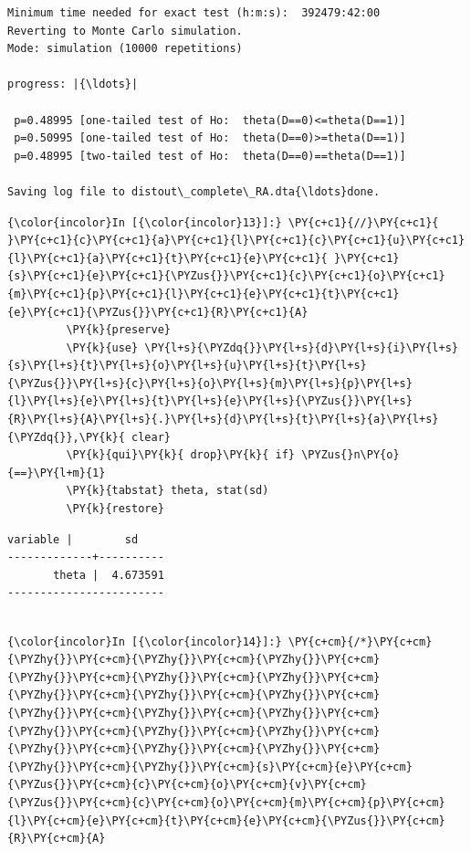 \documentclass[11pt,notitlepage]{article}\usepackage[]{graphicx}\usepackage[]{color}
\makeatletter
\newenvironment{kframe}{%
 \def\at@end@of@kframe{}%
 \ifinner\ifhmode%
  \def\at@end@of@kframe{\end{minipage}}%
  \begin{minipage}{\columnwidth}%
 \fi\fi%
 \def\FrameCommand##1{\hskip\@totalleftmargin \hskip-\fboxsep
 \colorbox{shadecolor}{##1}\hskip-\fboxsep
     \hskip-\linewidth \hskip-\@totalleftmargin \hskip\columnwidth}%
 \MakeFramed {\advance\hsize-\width
   \@totalleftmargin\z@ \linewidth\hsize
   \@setminipage}}%
 {\par\unskip\endMakeFramed%
 \at@end@of@kframe}
\newenvironment{knitrout}{}{} %
\makeatother
\begin{document}
\begin{enumerate}[a)]
\begin{knitrout}
\begin{kframe}
\begin{Verbatim}[commandchars=\\\{\}]
Minimum time needed for exact test (h:m:s):  392479:42:00
Reverting to Monte Carlo simulation.
Mode: simulation (10000 repetitions)

progress: |{\ldots}|

 p=0.48995 [one-tailed test of Ho:  theta(D==0)<=theta(D==1)]
 p=0.50995 [one-tailed test of Ho:  theta(D==0)>=theta(D==1)]
 p=0.48995 [two-tailed test of Ho:  theta(D==0)==theta(D==1)]

Saving log file to distout\_complete\_RA.dta{\ldots}done.

    \end{Verbatim}

    \begin{Verbatim}[commandchars=\\\{\}]
{\color{incolor}In [{\color{incolor}13}]:} \PY{c+c1}{//}\PY{c+c1}{ }\PY{c+c1}{c}\PY{c+c1}{a}\PY{c+c1}{l}\PY{c+c1}{c}\PY{c+c1}{u}\PY{c+c1}{l}\PY{c+c1}{a}\PY{c+c1}{t}\PY{c+c1}{e}\PY{c+c1}{ }\PY{c+c1}{s}\PY{c+c1}{e}\PY{c+c1}{\PYZus{}}\PY{c+c1}{c}\PY{c+c1}{o}\PY{c+c1}{m}\PY{c+c1}{p}\PY{c+c1}{l}\PY{c+c1}{e}\PY{c+c1}{t}\PY{c+c1}{e}\PY{c+c1}{\PYZus{}}\PY{c+c1}{R}\PY{c+c1}{A}
         \PY{k}{preserve}
         \PY{k}{use} \PY{l+s}{\PYZdq{}}\PY{l+s}{d}\PY{l+s}{i}\PY{l+s}{s}\PY{l+s}{t}\PY{l+s}{o}\PY{l+s}{u}\PY{l+s}{t}\PY{l+s}{\PYZus{}}\PY{l+s}{c}\PY{l+s}{o}\PY{l+s}{m}\PY{l+s}{p}\PY{l+s}{l}\PY{l+s}{e}\PY{l+s}{t}\PY{l+s}{e}\PY{l+s}{\PYZus{}}\PY{l+s}{R}\PY{l+s}{A}\PY{l+s}{.}\PY{l+s}{d}\PY{l+s}{t}\PY{l+s}{a}\PY{l+s}{\PYZdq{}},\PY{k}{ clear}
         \PY{k}{qui}\PY{k}{ drop}\PY{k}{ if} \PYZus{}n\PY{o}{==}\PY{l+m}{1}
         \PY{k}{tabstat} theta, stat(sd)
         \PY{k}{restore}
\end{Verbatim}

    \begin{Verbatim}[commandchars=\\\{\}]
    variable |        sd
-------------+----------
       theta |  4.673591
------------------------


    \end{Verbatim}

    \begin{Verbatim}[commandchars=\\\{\}]
{\color{incolor}In [{\color{incolor}14}]:} \PY{c+cm}{/*}\PY{c+cm}{\PYZhy{}}\PY{c+cm}{\PYZhy{}}\PY{c+cm}{\PYZhy{}}\PY{c+cm}{\PYZhy{}}\PY{c+cm}{\PYZhy{}}\PY{c+cm}{\PYZhy{}}\PY{c+cm}{\PYZhy{}}\PY{c+cm}{\PYZhy{}}\PY{c+cm}{\PYZhy{}}\PY{c+cm}{\PYZhy{}}\PY{c+cm}{\PYZhy{}}\PY{c+cm}{\PYZhy{}}\PY{c+cm}{\PYZhy{}}\PY{c+cm}{\PYZhy{}}\PY{c+cm}{\PYZhy{}}\PY{c+cm}{\PYZhy{}}\PY{c+cm}{\PYZhy{}}\PY{c+cm}{\PYZhy{}}\PY{c+cm}{\PYZhy{}}\PY{c+cm}{\PYZhy{}}\PY{c+cm}{s}\PY{c+cm}{e}\PY{c+cm}{\PYZus{}}\PY{c+cm}{c}\PY{c+cm}{o}\PY{c+cm}{v}\PY{c+cm}{\PYZus{}}\PY{c+cm}{c}\PY{c+cm}{o}\PY{c+cm}{m}\PY{c+cm}{p}\PY{c+cm}{l}\PY{c+cm}{e}\PY{c+cm}{t}\PY{c+cm}{e}\PY{c+cm}{\PYZus{}}\PY{c+cm}{R}\PY{c+cm}{A}
         

\end{Verbatim}
\end{kframe}
\end{knitrout}
\end{enumerate}
\end{document}
